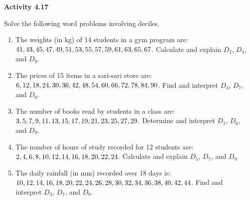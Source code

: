 \vspace{0.3ex}
\noindent\textbf{Activity 4.17}

\vspace{0.2ex}

Solve the following word problems involving deciles.  

\begin{enumerate}
    \item The weights (in kg) of 14 students in a gym program are: \(41, 43, 45, 47, 49, 51,\\ 53, 55, 57, 59, 61, 63, 65, 67\). Calculate and explain \(D_2\), \(D_4\), and \(D_9\). %
    \item The prices of 15 items in a sari-sari store are: \(6, 12, 18, 24, 30, 36,\\ 42, 48, 54, 60, 66, 72, 78, 84, 90\). Find and interpret \(D_4\), \(D_7\), and \(D_8\). %
    \item The number of books read by students in a class are: \(3, 5, 7, 9, 11, 13, 15, 17,\\ 19, 21, 23, 25, 27, 29\). Determine  and interpret \(D_1\), \(D_6\), and \(D_9\). %
    \item The number of hours of study recorded for 12 students are: \(2, 4, 6, 8, 10, 12, 14,\\ 16, 18, 20, 22, 24\). Calculate and explain \(D_5\), \(D_7\), and \(D_9\). %
    \item The daily rainfall (in mm) recorded over 18 days is: \(10, 12, 14, 16, 18, 20, 22,\\ 24, 26, 28, 30, 32, 34, 36, 38, 40, 42, 44\). Find and interpret \(D_3\), \(D_7\), and \(D_9\). %
\end{enumerate}
